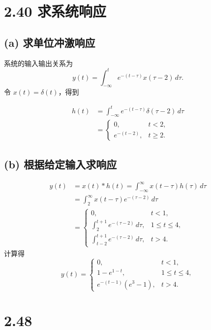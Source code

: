 \documentclass[UTF8, fontset=fandol,12pt, a4paper]{ctexart}
\begin{document}
\newpage
\raggedbottom
\section* {2.40 求系统响应}

\subsection* {(a) 求单位冲激响应}
系统的输入输出关系为
\[
  y(t)=\int_{-\infty}^{t}e^{-(t-\tau)}x(\tau-2)\,d\tau.
\]
令 $x(t)=\delta(t)$，得到

\begin{align*}
  h(t) &=\int_{-\infty}^{t}e^{-(t-\tau)}\delta(\tau-2)\,d\tau \\
       &=\boxed{\begin{cases}
          0, &t<2,\\[0.3em]
          e^{-(t-2)}, &t\ge2.
        \end{cases}}
\end{align*}

\subsection* {(b) 根据给定输入求响应}

\begin{align*}
  y(t) &=x(t)*h(t)
        =\int_{-\infty}^{\infty}x(t-\tau)h(\tau)\,d\tau \\
       &=\int_{2}^{\infty}x(t-\tau)e^{-(\tau-2)}\,d\tau \\
       &=\begin{cases}
          0, &t<1,\\[0.5em]
          \displaystyle\int_{2}^{t+1}e^{-(\tau-2)}\,d\tau,
            &1\le t\le4,\\[0.8em]
          \displaystyle\int_{t-2}^{t+1}e^{-(\tau-2)}\,d\tau,
            &t>4.
        \end{cases}
\end{align*}
计算得
\[
  \boxed{
  y(t)=\begin{cases}
    0, &t<1,\\[0.4em]
    1-e^{1-t}, &1\le t\le4,\\[0.4em]
    e^{-(t-1)}(e^3-1), &t>4.
  \end{cases}}
\]

\newpage
\section* {2.48}
\end{document}
